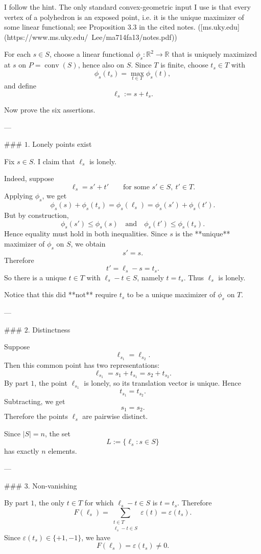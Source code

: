 I follow the hint. The only standard convex-geometric input I use is that every vertex of a polyhedron is an exposed point, i.e. it is the unique maximizer of some linear functional; see Proposition \(3.3\) in the cited notes. ([ms.uky.edu](https://www.ms.uky.edu/~Lee/ma714fa13/notes.pdf))

For each \(s\in S\), choose a linear functional \(\phi_s:\mathbb R^2\to\mathbb R\) that is uniquely maximized at \(s\) on \(P=\operatorname{conv}(S)\), hence also on \(S\). Since \(T\) is finite, choose \(t_s\in T\) with
\[
\phi_s(t_s)=\max_{t\in T}\phi_s(t),
\]
and define
\[
\ell_s:=s+t_s.
\]

Now prove the six assertions.

---

### \(1.\) Lonely points exist

Fix \(s\in S\). I claim that \(\ell_s\) is lonely.

Indeed, suppose
\[
\ell_s=s'+t'
\qquad\text{for some }s'\in S,\ t'\in T.
\]
Applying \(\phi_s\), we get
\[
\phi_s(s)+\phi_s(t_s)
=\phi_s(\ell_s)
=\phi_s(s')+\phi_s(t').
\]
But by construction,
\[
\phi_s(s')\le \phi_s(s)
\quad\text{and}\quad
\phi_s(t')\le \phi_s(t_s).
\]
Hence equality must hold in both inequalities. Since \(s\) is the **unique** maximizer of \(\phi_s\) on \(S\), we obtain
\[
s'=s.
\]
Therefore
\[
t'=\ell_s-s=t_s.
\]
So there is a unique \(t\in T\) with \(\ell_s-t\in S\), namely \(t=t_s\). Thus \(\ell_s\) is lonely.

Notice that this did **not** require \(t_s\) to be a unique maximizer of \(\phi_s\) on \(T\).

---

### \(2.\) Distinctness

Suppose
\[
\ell_{s_1}=\ell_{s_2}.
\]
Then this common point has two representations:
\[
\ell_{s_1}=s_1+t_{s_1}=s_2+t_{s_2}.
\]
By part \(1\), the point \(\ell_{s_1}\) is lonely, so its translation vector is unique. Hence
\[
t_{s_1}=t_{s_2}.
\]
Subtracting, we get
\[
s_1=s_2.
\]
Therefore the points \(\ell_s\) are pairwise distinct.

Since \(|S|=n\), the set
\[
L:=\{\ell_s:s\in S\}
\]
has exactly \(n\) elements.

---

### \(3.\) Non-vanishing

By part \(1\), the only \(t\in T\) for which \(\ell_s-t\in S\) is \(t=t_s\). Therefore
\[
F(\ell_s)
=
\sum_{\substack{t\in T\\ \ell_s-t\in S}} \varepsilon(t)
=
\varepsilon(t_s).
\]
Since \(\varepsilon(t_s)\in\{+1,-1\}\), we have
\[
F(\ell_s)=\varepsilon(t_s)\neq 0.
\]

